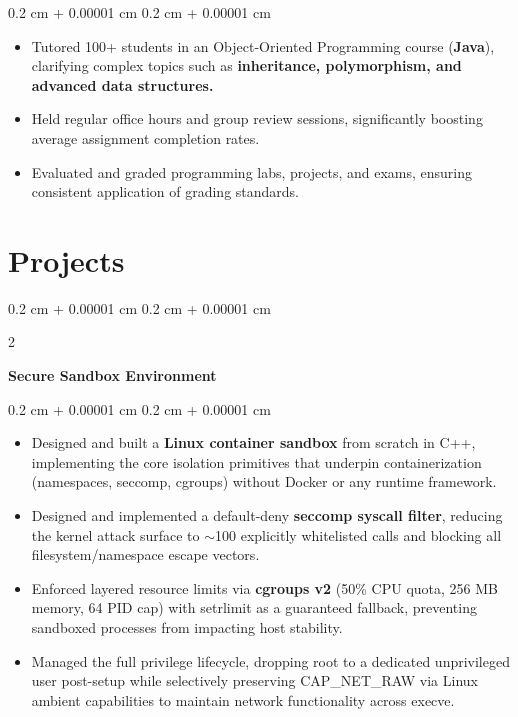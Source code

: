 \documentclass[10pt, letterpaper]{article}
\newenvironment{highlights}{
    \begin{itemize}[
        topsep=0.10 cm,
        parsep=0.10 cm,
        partopsep=0pt,
        itemsep=0pt,
        leftmargin=0.4 cm + 10pt
    ]
}{
    \end{itemize}
} %
\newenvironment{onecolentry}{
    \begin{adjustwidth}{
        0.2 cm + 0.00001 cm
    }{
        0.2 cm + 0.00001 cm
    }
}{
    \end{adjustwidth}
} %
\newenvironment{twocolentry}[2][]{
    \onecolentry
    \def\secondColumn{#2}
    \setcolumnwidth{\fill, 4.5 cm}
    \begin{paracol}{2}
}{
    \switchcolumn \raggedleft \secondColumn
    \end{paracol}
    \endonecolentry
} %
\begin{document}
        \vspace{0.10 cm}
        \begin{onecolentry}
            \begin{highlights}
                \item Tutored 100+ students in an Object-Oriented Programming course (\textbf{Java}), clarifying complex topics such as \textbf{inheritance, polymorphism, and advanced data structures.}
                \item Held regular office hours and group review sessions, significantly boosting average assignment completion rates.
                \item Evaluated and graded programming labs, projects, and exams, ensuring consistent application of grading standards.

            \end{highlights}
        \end{onecolentry}


    
    \section{Projects}
        

    \begin{twocolentry}{


        \textit{{}{}}}
            \textbf{Secure Sandbox Environment}
        \end{twocolentry}

        \vspace{0.10 cm}
        \begin{onecolentry}
            \begin{highlights}
            \item Designed and built a \textbf{Linux container sandbox} from scratch in C++, implementing the core isolation primitives that underpin containerization (namespaces, seccomp, cgroups) without Docker or any runtime framework.
                \item Designed and implemented a default-deny \textbf{seccomp syscall filter}, reducing the kernel attack surface to $\sim$100 explicitly whitelisted calls and blocking all filesystem/namespace escape vectors.
                \item Enforced layered resource limits via \textbf{cgroups v2} (50\% CPU quota, 256 MB memory, 64 PID cap) with setrlimit as a guaranteed fallback, preventing sandboxed processes from impacting host stability.
                \item Managed the full privilege lifecycle, dropping root to a dedicated unprivileged user post-setup while selectively preserving CAP\_NET\_RAW via Linux ambient capabilities to maintain network functionality across execve.
            \end{highlights}
        \end{onecolentry}
\end{document}
